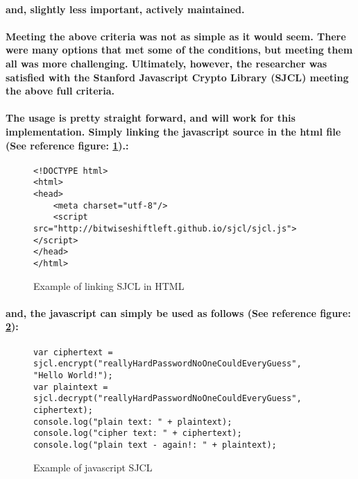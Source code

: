 \paragraph{and, slightly less important, actively maintained.}

\paragraph{Meeting the above criteria was not as simple as it would seem. There were many options that met some of the conditions, but meeting them all was more challenging. Ultimately, however, the researcher was satisfied with the Stanford Javascript Crypto Library (SJCL) meeting the above full criteria.}\cite[Website]{SJCL}

\paragraph{The usage is pretty straight forward, and will work for this implementation. Simply linking the javascript source in the html file (See reference figure: \ref{fig: exampleSJCL_html}).:}

\begin{figure}[H]
\begin{verbatim}
<!DOCTYPE html>
<html>
<head>
    <meta charset="utf-8"/>
    <script src="http://bitwiseshiftleft.github.io/sjcl/sjcl.js"></script>
</head>
</html>
\end{verbatim}
\caption{\label{fig: exampleSJCL_html} Example of linking SJCL in HTML}
\end{figure}

\paragraph{and, the javascript can simply be used as follows (See reference figure: \ref{fig: exampleSJCL_js}):}

\begin{figure}[H]
\centering
\begin{verbatim}
var ciphertext = sjcl.encrypt("reallyHardPasswordNoOneCouldEveryGuess", "Hello World!");
var plaintext = sjcl.decrypt("reallyHardPasswordNoOneCouldEveryGuess", ciphertext);
console.log("plain text: " + plaintext);
console.log("cipher text: " + ciphertext);
console.log("plain text - again!: " + plaintext);
\end{verbatim}
\caption{\label{fig: exampleSJCL_js} Example of javascript SJCL}
\end{figure}

